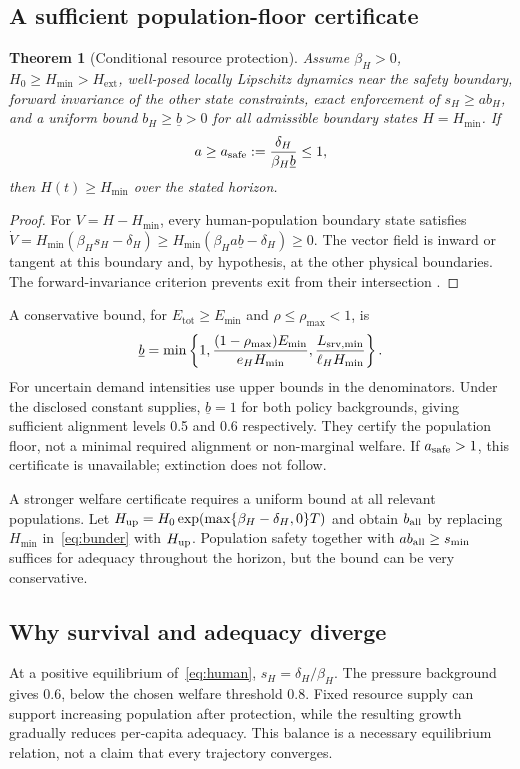 \documentclass[12pt,a4paper]{article}
\newtheorem{theorem}[proposition]{Theorem}
\theoremstyle{remark}
\newcommand{\Etotal}{E_{\mathrm{tot}}}
\newcommand{\Hext}{H_{\mathrm{ext}}}
\newcommand{\Hmin}{H_{\min}}
\begin{document}
\subsection{A sufficient population-floor certificate}
\begin{theorem}[Conditional resource protection]\label{thm:safety}
Assume $\beta_H>0$, $H_0\ge\Hmin>\Hext$, well-posed locally Lipschitz dynamics near the safety boundary, forward invariance of the other state constraints, exact enforcement of $s_H\ge ab_H$, and a uniform bound $b_H\ge\underline b>0$ for all admissible boundary states $H=\Hmin$. If
\begin{equation}\label{eq:asafe}
a\ge a_{\rm safe}:=\frac{\delta_H}{\beta_H\underline b}\le1,
\end{equation}
then $H(t)\ge\Hmin$ over the stated horizon.
\end{theorem}
\begin{proof}
For $V=H-\Hmin$, every human-population boundary state satisfies
$\dot V=\Hmin(\beta_Hs_H-\delta_H)\ge\Hmin(\beta_Ha\underline b-\delta_H)\ge0$.
The vector field is inward or tangent at this boundary and, by hypothesis, at the other physical boundaries. The forward-invariance criterion prevents exit from their intersection \cite{aubin}.
\end{proof}
A conservative bound, for $\Etotal\ge E_{\min}$ and $\rho\le\rho_{\max}<1$, is
\begin{equation}\label{eq:bunder}
\underline b=\min\left\{1,\frac{(1-\rho_{\max})E_{\min}}{e_H\Hmin},
\frac{L_{{\rm srv},\min}}{\ell_H\Hmin}\right\}.
\end{equation}
For uncertain demand intensities use upper bounds in the denominators. Under the disclosed constant supplies, $\underline b=1$ for both policy backgrounds, giving sufficient alignment levels 0.5 and 0.6 respectively. They certify the population floor, not a minimal required alignment or non-marginal welfare. If $a_{\rm safe}>1$, this certificate is unavailable; extinction does not follow.

A stronger welfare certificate requires a uniform bound at all relevant populations. Let $H_{\rm up}=H_0\exp(\max\{\beta_H-\delta_H,0\}T)$ and obtain $b_{\rm all}$ by replacing $\Hmin$ in~\eqref{eq:bunder} with $H_{\rm up}$. Population safety together with $ab_{\rm all}\ge s_{\min}$ suffices for adequacy throughout the horizon, but the bound can be very conservative.

\subsection{Why survival and adequacy diverge}
At a positive equilibrium of~\eqref{eq:human}, $s_H=\delta_H/\beta_H$. The pressure background gives 0.6, below the chosen welfare threshold 0.8. Fixed resource supply can support increasing population after protection, while the resulting growth gradually reduces per-capita adequacy. This balance is a necessary equilibrium relation, not a claim that every trajectory converges.
\end{document}
